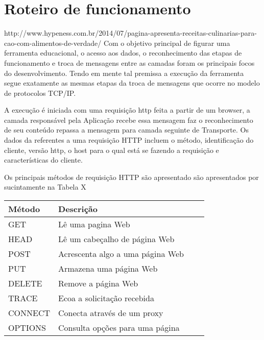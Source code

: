 
\chapter{Roteiro de funcionamento}
\label{Roteiro}
http://www.hypeness.com.br/2014/07/pagina-apresenta-receitas-culinarias-para-cao-com-alimentos-de-verdade/
Com o objetivo principal de figurar uma ferramenta educacional, o acesso aos dados, o reconhecimento das etapas de funcionamento e troca de mensagens entre as camadas foram os principais focos do desenvolvimento. Tendo em mente tal premissa a execução da ferramenta segue exatamente as mesmas etapas da troca de mensagens que ocorre no modelo de protocolos TCP/IP.

A execuç\~ao \'e iniciada com uma requisiç\~ao http feita a partir de um browser, a camada responsável pela Aplicação recebe essa mensagem faz o reconhecimento de seu conteúdo repassa a mensagem para camada seguinte de Transporte. Os dados da referentes a uma requisição HTTP incluem o método, identificação do cliente, versão http, o host para o qual está se fazendo a requisição e características do cliente.

Os principais métodos de requisição HTTP são apresentado são apresentados por  sucintamente na Tabela X

\begin{tabular}{ |p{3cm}||p{3cm}|p{3cm}|p{3cm}|  }
	\hline
	Método & Descrição\\
	\hline
	GET   	& Lê uma pagina Web\\
	HEAD	& Lê um cabeçalho de página Web\\
	POST 	& Acrescenta algo a uma página Web\\
	PUT    	& Armazena uma página Web\\
	DELETE	& Remove a página Web\\
	TRACE	& Ecoa a solicitação recebida\\
	CONNECT & Conecta através de um proxy\\
	OPTIONS & Consulta opções para uma página\\
	\hline
\end{tabular}
	 